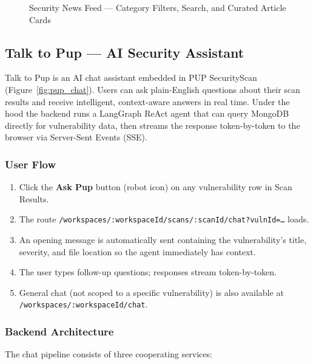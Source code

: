 \documentclass[12pt,a4paper]{report}
\begin{document}
\begin{figure}[H]
\centering
\fbox{\rule{0pt}{5cm}\rule{0.95\textwidth}{0pt}}
\caption{Security News Feed --- Category Filters, Search, and Curated Article Cards}
\label{fig:news_feed}
\end{figure}

\subsection{Talk to Pup --- AI Security Assistant}

Talk to Pup is an AI chat assistant embedded in PUP SecurityScan (Figure~\ref{fig:pup_chat}). Users can ask plain-English questions about their scan results and receive intelligent, context-aware answers in real time. Under the hood the backend runs a LangGraph ReAct agent that can query MongoDB directly for vulnerability data, then streams the response token-by-token to the browser via Server-Sent Events (SSE).

\subsubsection{User Flow}

\begin{enumerate}
    \item Click the \textbf{Ask Pup} button (robot icon) on any vulnerability row in Scan Results.
    \item The route \texttt{/workspaces/:workspaceId/scans/:scanId/chat?vulnId=\ldots} loads.
    \item An opening message is automatically sent containing the vulnerability's title, severity, and file location so the agent immediately has context.
    \item The user types follow-up questions; responses stream token-by-token.
    \item General chat (not scoped to a specific vulnerability) is also available at \texttt{/workspaces/:workspaceId/chat}.
\end{enumerate}

\subsubsection{Backend Architecture}

The chat pipeline consists of three cooperating services:
\end{document}
